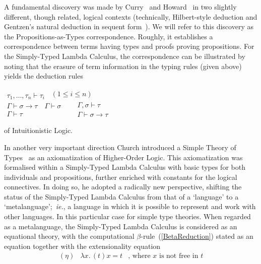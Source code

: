 \documentclass[11pt,twocolumn]{article}
\newcommand{\ie}{\emph{ie.}}
\begin{document}
A fundamental discovery was made
by Curry~\cite{Curry1934} and Howard~\cite{Howard1969}
in two slightly different, though related, logical
contexts (technically, Hilbert-style deduction %
and Gentzen's natural deduction in sequent form~\cite{Gentzen1935}).
We will refer to this discovery as the 
Propositions-as-Types correspondence. %
Roughly, it establishes a correspondence between terms having types and proofs
proving propositions.  For the Simply-Typed Lambda Calculus, the correspondence
can be illustrated by noting that the erasure of term information in the typing 
rules (given above) yields the deduction rules\\[-7mm]
  \begin{center}
  $\begin{array}{c}
    \\ \hline
    \tau_1,\ldots,\tau_n\vdash \tau_i
  \end{array}
  \enspace(1\leq i\leq n)$
  \\[2mm]
  $\begin{array}{c}
    \Gamma\vdash \sigma\to\tau
    \quad 
    \Gamma\vdash\sigma 
    \\ \hline
    \Gamma\vdash\tau
  \end{array}
  \enspace\quad
  \begin{array}{c}
    \Gamma,\sigma\vdash\tau
    \\ \hline
    \Gamma\vdash\sigma\to\tau
  \end{array}$
\end{center}
\vspace*{-1mm}
of Intuitionistic %
Logic. %

In another very important direction Church introduced a Simple Theory of
Types~\cite{Church1940} as an axiomatization of Higher-Order Logic.
This axiomatization was formalised within a Simply-Typed Lambda Calculus with basic types
for both individuals and propositions, further enriched with constants for the logical
connectives.  In doing so, he adopted a radically new perspective,
shifting the status of the Simply-Typed Lambda Calculus from that of 
a `language' to a `metalanguage';~\ie, a language in which it is
possible to represent and work with other languages. In this particular case
for simple type theories.  When regarded as a metalanguage, the Simply-Typed
Lambda Calculus is considered as an equational theory, with the
computational \mbox{$\beta$-rule}~(\ref{BetaReduction}) stated as an
equation together with the extensionality equation
\[\begin{array}{rll}
(\eta) & \lambda x.\,(t)x = t 
& \mbox{, where $x$ is not free in $t$}
  \end{array}\]
\end{document}
